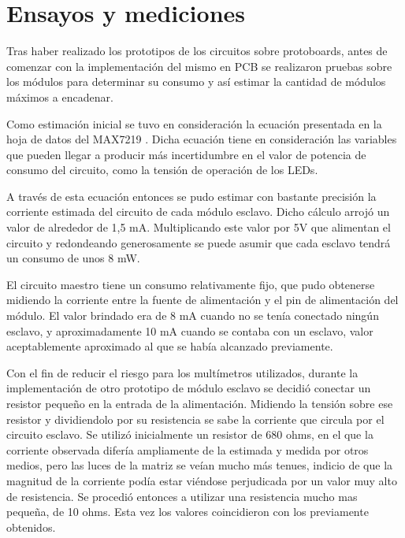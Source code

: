 \clearpage



\clearpage
\part{Ensayos y mediciones}\label{part:ensayos}

Tras haber realizado los prototipos de los circuitos sobre protoboards, antes de comenzar con la implementación del mismo en PCB se realizaron pruebas sobre los módulos para determinar su consumo y así estimar la cantidad de módulos máximos a encadenar.

Como estimación inicial se tuvo en consideración la ecuación presentada en la hoja de datos del MAX7219 \cite{MAX7219}. Dicha ecuación tiene en consideración las variables que pueden llegar a producir más incertidumbre en el valor de potencia de consumo del circuito, como la tensión de operación de los LEDs.

A través de esta ecuación entonces se pudo estimar con bastante precisión la corriente estimada del circuito de cada módulo esclavo. Dicho cálculo arrojó un valor de alrededor de 1,5 mA. Multiplicando este valor por 5V que alimentan el circuito y redondeando generosamente se puede asumir que cada esclavo tendrá un consumo de unos 8 mW.

El circuito maestro tiene un consumo relativamente fijo, que pudo obtenerse midiendo la corriente entre la fuente de alimentación y el pin de alimentación del módulo. El valor brindado era de 8 mA cuando no se tenía conectado ningún esclavo, y aproximadamente 10 mA cuando se contaba con un esclavo, valor aceptablemente aproximado al que se había alcanzado previamente.

Con el fin de reducir el riesgo para los multímetros utilizados, durante la implementación de otro prototipo de módulo esclavo se decidió conectar un resistor pequeño en la entrada de la alimentación. Midiendo la tensión sobre ese resistor y dividiendolo por su resistencia se sabe la corriente que circula por el circuito esclavo. Se utilizó inicialmente un resistor de 680 ohms, en el que la corriente observada difería ampliamente de la estimada y medida por otros medios, pero las luces de la matriz se veían mucho más tenues, indicio de que la magnitud de la corriente podía estar viéndose perjudicada por un valor muy alto de resistencia. Se procedió entonces a utilizar una resistencia mucho mas pequeña, de 10 ohms. Esta vez los valores coincidieron con los previamente obtenidos.

